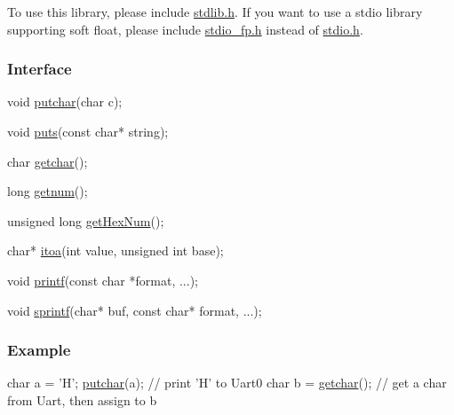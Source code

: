 To use this library, please include {\ttfamily \mbox{\hyperlink{a00032}{stdlib.\+h}}}. If you want to use a stdio library supporting soft float, please include {\ttfamily \mbox{\hyperlink{a00029}{stdio\+\_\+fp.\+h}}} instead of {\ttfamily \mbox{\hyperlink{a00026}{stdio.\+h}}}.

\subsubsection*{Interface}


\begin{DoxyCode}
\textcolor{keywordtype}{void} \mbox{\hyperlink{a00026_a948b7a0779c308ac5502c57e282e6933}{putchar}}(\textcolor{keywordtype}{char} c);

\textcolor{keywordtype}{void} \mbox{\hyperlink{a00026_a46036bd75b920766eef64eb7910c887d}{puts}}(\textcolor{keyword}{const} \textcolor{keywordtype}{char}* \textcolor{keywordtype}{string});

\textcolor{keywordtype}{char} \mbox{\hyperlink{a00026_a0979671914792955a7a68461634ff82d}{getchar}}();

\textcolor{keywordtype}{long} \mbox{\hyperlink{a00026_a46d9f17d80612d1174eab96f53c7c5b7}{getnum}}();

\textcolor{keywordtype}{unsigned} \textcolor{keywordtype}{long} \mbox{\hyperlink{a00026_af48103646b7cb053e55eb3867a05fc85}{getHexNum}}();

\textcolor{keywordtype}{char}* \mbox{\hyperlink{a00026_ac399b37e5355c704e130b1c6f60b71ec}{itoa}}(\textcolor{keywordtype}{int} value, \textcolor{keywordtype}{unsigned} \textcolor{keywordtype}{int} base);

\textcolor{keywordtype}{void} \mbox{\hyperlink{a00026_a133c04c35a1c14c6f8d8078831705661}{printf}}(\textcolor{keyword}{const} \textcolor{keywordtype}{char} *format, ...);

\textcolor{keywordtype}{void} \mbox{\hyperlink{a00026_ab416b2a62f47ec0095853e37ba84e78b}{sprintf}}(\textcolor{keywordtype}{char}* buf, \textcolor{keyword}{const} \textcolor{keywordtype}{char}* format, ...);
\end{DoxyCode}


\subsubsection*{Example}


\begin{DoxyCode}
\textcolor{keywordtype}{char} a = \textcolor{charliteral}{'H'}; \mbox{\hyperlink{a00026_a948b7a0779c308ac5502c57e282e6933}{putchar}}(a);            \textcolor{comment}{// print 'H' to Uart0}
\textcolor{keywordtype}{char} b = \mbox{\hyperlink{a00026_a0979671914792955a7a68461634ff82d}{getchar}}();                  \textcolor{comment}{// get a char from Uart, then assign to b}
\end{DoxyCode}
 